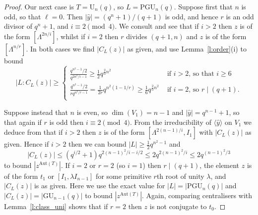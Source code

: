 \documentclass[twoside,a4paper,reqno,11pt]{amsart}
\newcommand{\wy}{\widehat{y}}
\newcommand{\<}{\langle}
\renewcommand{\>}{\rangle}
\newcommand{\la}{\langle}
\newcommand{\ra}{\rangle}
\newcommand{\leqs}{\leqslant}
\newcommand{\geqs}{\geqslant}
\newcommand{\Aut}{\mathrm{Aut}}
\newcommand{\UU}{\mathrm{U}}
\newcommand{\PGU}{\mathrm{PGU}}
\newcommand{\GU}{\mathrm{GU}}
\theoremstyle{definition}
\begin{document}
\begin{proof}
    Our next case is $T = \UU_n(q)$, so $L = \PGU_n(q)$. Suppose first that $n$ is odd, so that $\ell = 0$. Then $|\wy| = (q^n + 1)/(q + 1)$ is odd, and hence $r$ is an odd  divisor of $q^n+1$, and $i \equiv 2 \pmod 4$.  We consult \cite[Table B.4]{BG_classical} and see that %
    if $i > 2$  then $z$ is of the form $[\Lambda^{2n/i}]$, whilst if $i = 2$ then $r$ divides $(q+1, n)$ and $z$ is of the form $[\Lambda^{n/r}]$. In both cases we find $|C_{L}(z)|$ as given, and use Lemma~\ref{l:order}(i) to bound
    \[ |L:C_L(z)| \geqs  \begin{cases}
        \frac{q^{n^2-1}/2}{q^{2n^2/i - 1}} \geqs \frac{1}{2}q^{\frac{2}{3}n^2} & \mbox{ if $i > 2$, so that $i \geqs 6$}\\
        \frac{q^{n^2 - 1}/2}{rq^{n^2/r - 1}} = \frac{1}{2r}q^{n^2(1 - 1/r)} \geqs \frac{1}{6}q^{\frac{2}{3}n^2} & \mbox{ if $i = 2$, so $r \mid (q+1)$.}\\
    \end{cases}
      \]  
      
    Suppose instead that $n$ is even, so %
    $\dim(V_1) = n-1$ and $|\wy| = q^{n-1}+1$, so that again if $r$ is odd then $i \equiv 2 \pmod 4$. 
    From the irreducibility of $\la \wy \ra$ on $V_{1}$ we deduce from \cite[Table~B.4]{BG_classical} that 
    if $i > 2$ then 
    $z$ is of the form $[\Lambda^{2(n-1)/i}, I_1]$ with $|C_{L}(z)|$ as given. Hence if $i > 2$ then we can bound $|L| \geqs \frac{1}{2}q^{n^2-1}$ and
    \begin{equation*}
    |C_L(z)| \leqs (q^{i/2}+1)q^{2(n-1)^2/i-i/2} \leqs 2q^{2(n-1)^2/i} \leqs 2q^{(n-1)^2/3}
    \end{equation*}
    to bound $|z^{\Aut(T)}|$. 
    If $i = 2$ or $r = 2$ (so $i = 1$) then $r \mid (q+1)$, the element $z$ is of the form $t_1$ 
   or $[I_1, \lambda I_{n-1}]$ for some primitive $r$th root of unity $\lambda$, 
    and $|C_L(z)|$ is as given. %
    Here we use the exact value for $|L| = |\PGU_n(q)|$ and $|C_L(z)| = |\GU_{n-1}(q)|$ to bound $|z^{\Aut(T)}|$. 
Again, comparing centralisers with Lemma~\ref{l:class_uni} shows that if $r = 2$ then $z$ is not conjugate to $t_0$.



\end{proof}
\end{document}
